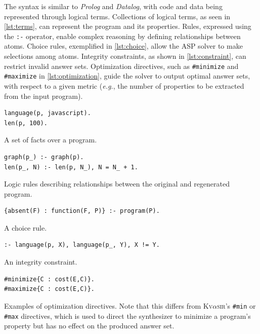 \documentclass[nonacm,sigplan,review]{acmart}
\def\eg{{\em e.g.}, }
\newcommand{\sys}{{\scshape Kv{$\alpha$}sir}\xspace}
\newcommand{\ttt}[1]{\texttt{#1}\xspace}
\begin{document}
The syntax is similar to \textit{Prolog} and \textit{Datalog}, with code and data being represented
through logical terms.
Collections of logical terms, as seen in
\cref{lst:terms}, can represent the program and its properties.
Rules, expressed using
the \ttt{:-} operator, enable complex reasoning by defining relationships
between atoms.
Choice rules, exemplified in \cref{lst:choice}, allow the ASP
solver to make selections among atoms.
Integrity constraints, as shown in
\cref{lst:constraint}, can restrict invalid answer sets. Optimization
directives, such as \ttt{\#minimize} and \ttt{\#maximize} in
\cref{lst:optimization}, guide the solver to output optimal answer sets,
with respect to a given metric (\eg the number of properties to be extracted from the input program).

\begin{listing}
\begin{verbatim}
language(p, javascript).
len(p, 100).
\end{verbatim}
\caption{A set of facts over a program.}
\label{lst:terms}
\end{listing}

\begin{listing}
\begin{verbatim}
graph(p_) :- graph(p).
len(p_, N) :- len(p, N_), N = N_ + 1.
\end{verbatim}
\caption{Logic rules describing relationships between the original and regenerated program.}
\label{lst:rules}
\end{listing}

\begin{listing}
\begin{verbatim}
{absent(F) : function(F, P)} :- program(P).
\end{verbatim}
\caption{A choice rule.}
\label{lst:choice}
\end{listing}

\begin{listing}
\begin{verbatim}
:- language(p, X), language(p_, Y), X != Y.
\end{verbatim}
\caption{An integrity constraint.}
\label{lst:constraint}
\end{listing}

\begin{listing}
\begin{verbatim}
#minimize{C : cost(E,C)}.
#maximize{C : cost(E,C)}.
\end{verbatim}
\caption{Examples of optimization directives. Note that this differs from \sys's \ttt{\#min} or \ttt{\#max} directives, which is used to direct the synthesizer to minimize a program's property but has no effect on the produced answer set.}
\label{lst:optimization}
\end{listing}
\end{document}
